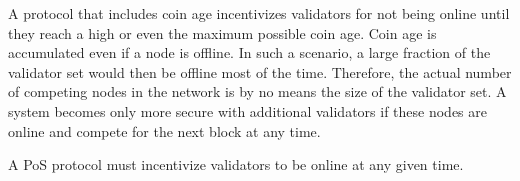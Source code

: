 A protocol that includes coin age incentivizes validators for not being online until they reach a high or even the maximum possible coin age. Coin age is accumulated even if a node is offline. In such a scenario, a large fraction of the validator set would then be offline most of the time. Therefore, the actual number of competing nodes in the network is by no means the size of the validator set. A system becomes only more secure with additional validators if these nodes are online and compete for the next block at any time.

A PoS protocol must incentivize validators to be online at any given time. 







